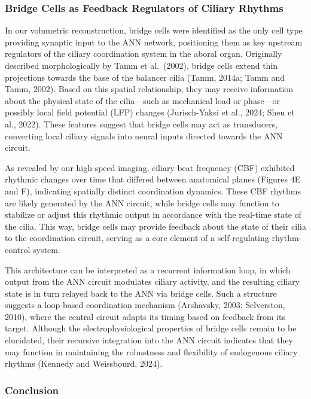 \documentclass[
  11pt,
]{article}
\begin{document}
\subsubsection{Bridge Cells as Feedback Regulators of Ciliary
Rhythms}\label{bridge-cells-as-feedback-regulators-of-ciliary-rhythms}

In our volumetric reconstruction, bridge cells were identified as the
only cell type providing synaptic input to the ANN network, positioning
them as key upstream regulators of the ciliary coordination system in
the aboral organ. Originally described morphologically by Tamm et
al.~(2002), bridge cells extend thin projections towards the base of the
balancer cilia (Tamm, 2014a; Tamm and Tamm, 2002). Based on this spatial
relationship, they may receive information about the physical state of
the cilia---such as mechanical load or phase---or possibly local field
potential (LFP) changes (Jurisch-Yaksi et al., 2024; Sheu et al., 2022).
These features suggest that bridge cells may act as transducers,
converting local ciliary signals into neural inputs directed towards the
ANN circuit.

As revealed by our high-speed imaging, ciliary beat frequency (CBF)
exhibited rhythmic changes over time that differed between anatomical
planes (Figures 4E and F), indicating spatially distinct coordination
dynamics. These CBF rhythms are likely generated by the ANN circuit,
while bridge cells may function to stabilize or adjust this rhythmic
output in accordance with the real-time state of the cilia. This way,
bridge cells may provide feedback about the state of their cilia to the
coordination circuit, serving as a core element of a self-regulating
rhythm-control system.

This architecture can be interpreted as a recurrent information loop, in
which output from the ANN circuit modulates ciliary activity, and the
resulting ciliary state is in turn relayed back to the ANN via bridge
cells. Such a structure suggests a loop-based coordination mechanism
(Arshavsky, 2003; Selverston, 2010), where the central circuit adapts
its timing based on feedback from its target. Although the
electrophysiological properties of bridge cells remain to be elucidated,
their recursive integration into the ANN circuit indicates that they may
function in maintaining the robustness and flexibility of endogenous
ciliary rhythms (Kennedy and Weissbourd, 2024).

\subsubsection{Conclusion}\label{conclusion}
\end{document}
